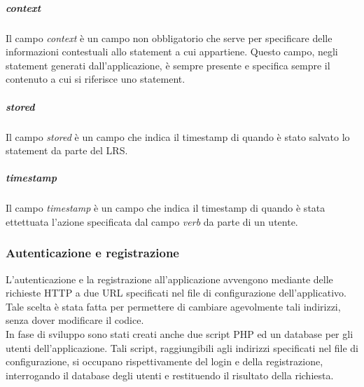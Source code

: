 \documentclass[../Tesi.tex]{subfiles}
\begin{document}
					\subparagraph{context}
					Il campo \textit{context} è un campo non obbligatorio che serve per specificare delle informazioni contestuali allo statement a cui appartiene. Questo campo, negli statement generati dall'applicazione, è sempre presente e specifica sempre il contenuto a cui si riferisce uno statement.

					\subparagraph{stored}
					Il campo \textit{stored} è un campo che indica il timestamp di quando è stato salvato lo statement da parte del LRS.

					\subparagraph{timestamp}
					Il campo \textit{timestamp} è un campo che indica il timestamp di quando è stata ettettuata l'azione specificata dal campo \textit{verb} da parte di un utente.

				
				

			\subsubsection{Autenticazione e registrazione}
			L'autenticazione e la registrazione all'applicazione avvengono mediante delle richieste HTTP a due URL specificati nel file di configurazione dell'applicativo. Tale scelta è stata fatta per permettere di cambiare agevolmente tali indirizzi, senza dover modificare il codice. \\In fase di sviluppo sono stati creati anche due script PHP ed un database per gli utenti dell'applicazione. Tali script, raggiungibili agli indirizzi specificati nel file di configurazione, si occupano rispettivamente del login e della registrazione, interrogando il database degli utenti e restituendo il risultato della richiesta.
\end{document}
